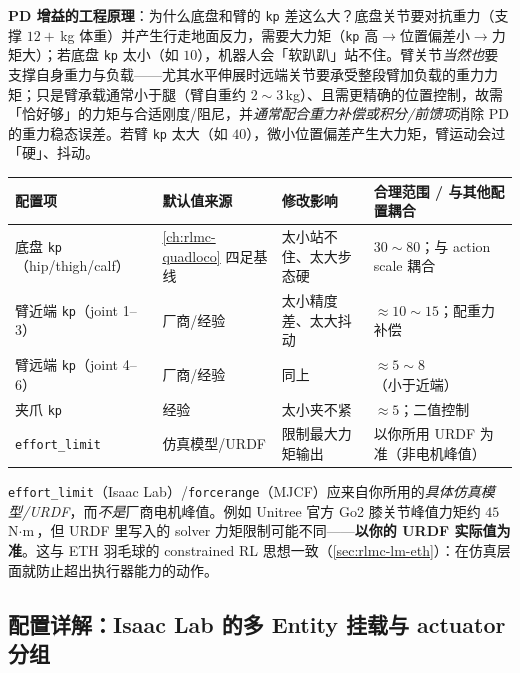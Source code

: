 \textbf{PD 增益的工程原理}：为什么底盘和臂的 \verb|kp| 差这么大？底盘关节要对抗重力（支撑 $12+\,$kg 体重）并产生行走地面反力，需要大力矩（\verb|kp| 高$\to$位置偏差小$\to$力矩大）；若底盘 \verb|kp| 太小（如 $10$），机器人会「软趴趴」站不住。臂关节\emph{当然也}要支撑自身重力与负载——尤其水平伸展时远端关节要承受整段臂加负载的重力力矩；只是臂承载通常小于腿（臂自重约 $2\!\sim\!3\,$kg）、且需更精确的位置控制，故需「恰好够」的力矩与合适刚度/阻尼，并\emph{通常配合重力补偿或积分/前馈项}消除 PD 的重力稳态误差。若臂 \verb|kp| 太大（如 $40$），微小位置偏差产生大力矩，臂运动会过「硬」、抖动。

\begin{center}
\small
\begin{tabular}{@{}llll@{}}
\toprule
配置项 & 默认值来源 & 修改影响 & 合理范围 / 与其他配置耦合 \\
\midrule
底盘 \texttt{kp}（hip/thigh/calf） & \cref{ch:rlmc-quadloco} 四足基线 & 太小站不住、太大步态硬 & $30\!\sim\!80$；与 action scale 耦合 \\
臂近端 \texttt{kp}（joint 1--3） & 厂商/经验 & 太小精度差、太大抖动 & $\approx 10\!\sim\!15$；配重力补偿 \\
臂远端 \texttt{kp}（joint 4--6） & 厂商/经验 & 同上 & $\approx 5\!\sim\!8$（小于近端） \\
夹爪 \texttt{kp} & 经验 & 太小夹不紧 & $\approx 5$；二值控制 \\
\texttt{effort\_limit} & 仿真模型/URDF & 限制最大力矩输出 & 以你所用 URDF 为准（非电机峰值） \\
\bottomrule
\end{tabular}
\end{center}

\begin{note}
\verb|effort_limit|（Isaac Lab）/\verb|forcerange|（MJCF）应来自你所用的\emph{具体仿真模型/URDF}，而\emph{不是}厂商电机峰值。例如 Unitree 官方 Go2 膝关节峰值力矩约 $45\,$N$\cdot$m\,\cite{unitree2023go2}，但 URDF 里写入的 solver 力矩限制可能不同——\textbf{以你的 URDF 实际值为准}。这与 ETH 羽毛球的 constrained RL 思想一致（\cref{sec:rlmc-lm-eth}）：在仿真层面就防止超出执行器能力的动作。
\end{note}

\subsection{配置详解：Isaac Lab 的多 Entity 挂载与 actuator 分组}
\label{sec:rlmc-lm-isaaclab-asset}

